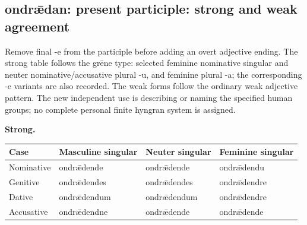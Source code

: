 \par\begin{minipage}{\linewidth}\raggedright
\subsection*{ondrǣdan: present participle: strong and weak agreement}

Remove final -e from the participle before adding an overt adjective ending. The strong table follows the grēne type: selected feminine nominative singular and neuter nominative/\allowbreak{}accusative plural -u, and feminine plural -a; the corresponding -e variants are also recorded. The weak forms follow the ordinary weak adjective pattern. The new independent use is describing or naming the specified human groups; no complete personal finite hyngran system is assigned.

\textbf{Strong.}

\par\begingroup
\fontsize{10.5}{13.2}\selectfont
\setlength{\LTleft}{0pt}\setlength{\LTright}{\fill}
\noindent
\begin{tabular}{@{}>{\raggedright\arraybackslash}p{22.0mm}>{\raggedright\arraybackslash}p{31.188mm}>{\raggedright\arraybackslash}p{31.188mm}>{\raggedright\arraybackslash}p{31.188mm}@{}}
\toprule
\textbf{Case} & \textbf{Masculine singular} & \textbf{Neuter singular} & \textbf{Feminine singular} \\
\midrule
Nominative & ondrǣdende & ondrǣdende & ondrǣdendu \\
Genitive & ondrǣdendes & ondrǣdendes & ondrǣdendre \\
Dative & ondrǣdendum & ondrǣdendum & ondrǣdendre \\
Accusative & ondrǣdendne & ondrǣdende & ondrǣdende \\
\bottomrule
\end{tabular}
\par\endgroup
\end{minipage}\par
\par\addvspace{5pt}
\par\begingroup

